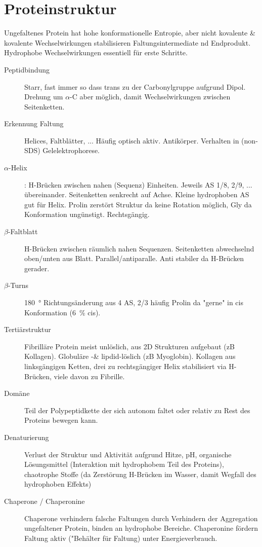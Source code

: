 \documentclass[a4paper,twocolumn,usegeometry,english,fontsize=6,DIV=16]{scrartcl}
\begin{document}
\section{Proteinstruktur}

Ungefaltenes Protein hat hohe konformationelle Entropie, aber nicht kovalente
\& kovalente Wechselwirkungen stabilisieren Faltungsintermediate nd Endprodukt.
Hydrophobe Wechselwirkungen essentiell für erste Schritte.

\begin{description}
	\item[Peptidbindung] Starr, fast immer so dass  trans zu 
		der Carbonylgruppe aufgrund Dipol. Drehung um $\alpha$-C aber
		möglich, damit Wechselwirkungen zwischen Seitenketten.
	\item[Erkennung Faltung] Helices, Faltblätter, ... Häufig optisch
		aktiv. Antikörper. Verhalten in (non-SDS) Gelelektrophorese.
	\item[$\alpha$-Helix]: H-Brücken zwischen nahen (Sequenz) Einheiten.
		Jeweils AS 1/8, 2/9, ... übereinander. Seitenketten senkrecht
		auf Achse. Kleine hydrophoben AS gut für Helix. Prolin zerstört
		Struktur da keine Rotation möglich, Gly da Konformation
		ungünstigt. Rechtsgängig.
	\item[$\beta$-Faltblatt] H-Brücken zwischen räumlich nahen Sequenzen.
		Seitenketten abwechselnd oben/unten aus Blatt.
		Parallel/antiparalle. Anti stabiler da H-Brücken gerader.
	\item[$\beta$-Turns] \SI{180}{\degree} Richtungsänderung aus 4 AS, 2/3
		häufig Prolin da "gerne" in cis Konformation (\SI{6}{\percent}
		cis).
	\item[Tertiärstruktur] Fibrilläre Protein meist unlöslich, aus 2D
		Strukturen aufgebaut (zB Kollagen). Globuläre -\&
		lipdid-löslich (zB Myoglobin). Kollagen aus linksgängigen
		Ketten, drei zu rechtsgängiger Helix stabilisiert via
		H-Brücken, viele davon zu Fibrille.
	\item[Domäne] Teil der Polypeptidkette der sich autonom faltet oder
		relativ zu Rest des Proteins bewegen kann.
	\item[Denaturierung] Verlust der Struktur und Aktivität aufgrund Hitze,
		pH, organische Lösungsmittel (Interaktion mit hydrophobem Teil
		des Proteins), chaotrophe Stoffe (da Zerstörung H-Brücken im
		Wasser, damit Wegfall des hydrophoben Effekts)
	\item[Chaperone / Chaperonine] Chaperone verhindern falsche Faltungen
		durch Verhindern der Aggregation ungefaltener Protein, binden
		an hydrophobe Bereiche. Chaperonine fördern Faltung aktiv
		("Behälter für Faltung) unter Energieverbrauch.
\end{description}
\end{document}
